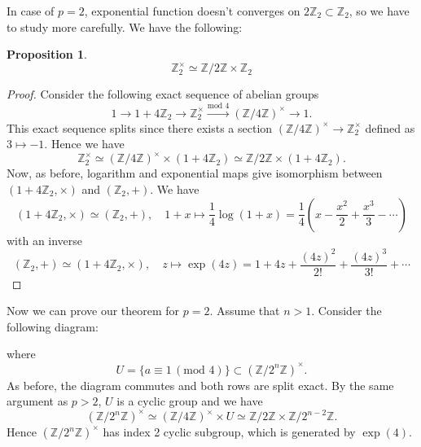 \documentclass{article}
\newtheorem{proposition}{Proposition}
\begin{document}
In case of $p=2$, exponential function doesn't converges on $2\mathbb{Z}_{2}\subset \mathbb{Z}_{2}$, so we have to study more carefully. We have the following:
\begin{proposition}
$$
\mathbb{Z}_{2}^{\times} \simeq \mathbb{Z}/2\mathbb{Z} \times \mathbb{Z}_{2}
$$
\end{proposition}
\begin{proof}
Consider the following exact sequence of abelian groups
$$
1 \to 1+4\mathbb{Z}_{2} \to \mathbb{Z}_{2}^{\times} \xrightarrow{\text{mod }4} (\mathbb{Z}/4\mathbb{Z})^{\times} \to 1.
$$
This exact sequence splits since there exists a section $(\mathbb{Z}/4\mathbb{Z})^{\times} \to \mathbb{Z}_{2}^{\times}$ defined as $3\mapsto -1$. Hence we have
$$
\mathbb{Z}_{2}^{\times} \simeq (\mathbb{Z}/4\mathbb{Z})^{\times}\times (1+4\mathbb{Z}_{2}) \simeq \mathbb{Z}/2\mathbb{Z}\times (1+4\mathbb{Z}_{2}). 
$$
Now, as before, logarithm and exponential maps give isomorphism between $(1+4\mathbb{Z}_{2}, \times)$ and $(\mathbb{Z}_{2}, +)$. We have 
$$
(1+4\mathbb{Z}_{2}, \times) \simeq (\mathbb{Z}_{2}, +), \quad 1+x \mapsto \frac{1}{4}\log(1+x) = \frac{1}{4}\left(x-\frac{x^{2}}{2} + \frac{x^{3}}{3} - \cdots\right)
$$
with an inverse 
$$
(\mathbb{Z}_{2}, +)\simeq (1+4\mathbb{Z}_{2}, \times), \quad z\mapsto \exp(4z) = 1 + 4z + \frac{(4z)^{2}}{2!} + \frac{(4z)^{3}}{3!} + \cdots
$$
\end{proof}
Now we can prove our theorem for $p=2$. Assume that $n>1$. 
Consider the following diagram:
\begin{center}
\end{center}
where 
$$
U = \{a\equiv 1\,(\text{mod }4)\} \subset (\mathbb{Z}/2^{n}\mathbb{Z})^{\times}.
$$
As before, the diagram commutes and both rows are split exact. By the same argument as $p>2$, $U$ is a cyclic group and we have $$(\mathbb{Z}/2^{n}\mathbb{Z})^{\times} \simeq (\mathbb{Z}/4\mathbb{Z})^{\times}\times  U\simeq \mathbb{Z}/2\mathbb{Z}\times \mathbb{Z}/2^{n-2}\mathbb{Z}.$$
Hence $(\mathbb{Z}/2^{n}\mathbb{Z})^{\times}$ has index 2 cyclic subgroup, which is generated by $\exp(4)$. 
\end{document}
